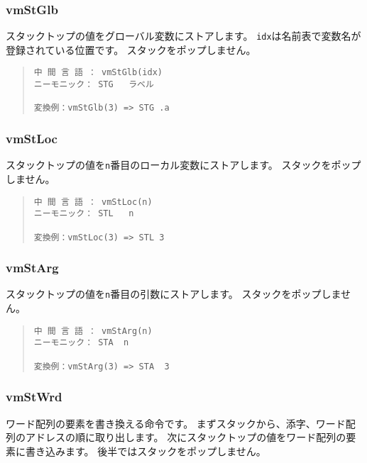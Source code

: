 \subsubsection{vmStGlb}

スタックトップの値をグローバル変数にストアします。
\verb/idx/は名前表で変数名が登録されている位置です。
スタックをポップしません。

\begin{quote}
\begin{verbatim}
中 間 言 語 ： vmStGlb(idx)
ニーモニック： STG   ラベル

変換例：vmStGlb(3) => STG .a
\end{verbatim}
\end{quote}

\subsubsection{vmStLoc}

スタックトップの値を\verb/n/番目のローカル変数にストアします。
スタックをポップしません。

\begin{quote}
\begin{verbatim}
中 間 言 語 ： vmStLoc(n)
ニーモニック： STL   n

変換例：vmStLoc(3) => STL 3
\end{verbatim}
\end{quote}

\subsubsection{vmStArg}

スタックトップの値を\verb/n/番目の引数にストアします。
スタックをポップしません。

\begin{quote}
\begin{verbatim}
中 間 言 語 ： vmStArg(n)
ニーモニック： STA  n   

変換例：vmStArg(3) => STA  3
\end{verbatim}
\end{quote}

\subsubsection{vmStWrd}

ワード配列の要素を書き換える命令です。
まずスタックから、添字、ワード配列のアドレスの順に取り出します。
次にスタックトップの値をワード配列の要素に書き込みます。
後半ではスタックをポップしません。

